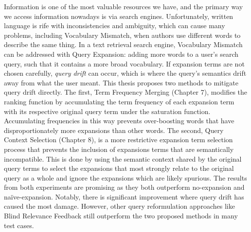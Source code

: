    







    

Information is one of the most valuable resources we have, and the primary way we access information nowadays is via search engines. Unfortunately, written language is rife with inconsistencies and ambiguity, which can cause many problems, including Vocabulary Mismatch, when authors use different words to describe the same thing. In a text retrieval search engine, Vocabulary Mismatch can be addressed with Query Expansion: adding more words to a user’s search query, such that it contains a more broad vocabulary. If expansion terms are not chosen carefully, \textit{query drift} can occur, which is where the query’s semantics drift away from what the user meant. This thesis proposes two methods to mitigate query drift directly. The first, Term Frequency Merging (Chapter 7), modifies the ranking function by accumulating the term frequency of each expansion term with its respective original query term under the saturation function. Accumulating frequencies in this way prevents over-boosting words that have disproportionately more expansions than other words. The second, Query Context Selection (Chapter 8), is a more restrictive expansion term selection process that prevents the inclusion of expansions terms that are semantically incompatible. This is done by using the semantic context shared by the original query terms to select the expansions that most strongly relate to the original query as a whole and ignore the expansions which are likely spurious. The results from both experiments are promising as they both outperform no-expansion and na{\"i}ve-expansion. Notably, there is significant improvement where query drift has caused the most damage. However, other query reformulation approaches like Blind Relevance Feedback still outperform the two proposed methods in many test cases.


